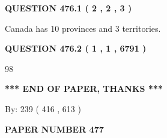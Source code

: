 \documentclass[12pt]{article}
\begin{document}
   
   
   
 \vspace{0.2in}
 
 
 
 
   
   
  
\vspace{0.2in}
  
{\textbf{\Large{QUESTION
476.1 
 ( 2 , 2 , 3 )
}}}
  
  
 
 
\noindent{}
 
 
Canada has 10  provinces and 3 territories.
 
 
 
 
  
\vspace{0.2in}
  
{\textbf{\Large{QUESTION
476.2 
 ( 1 , 1 , 6791 )
}}}
  
  
 
 
\noindent{}

98
 
 
   
   
 \vspace{0.2in}
 
   
   
   
   
\vspace{1.0in} 
{\textbf{\large{ *** END OF PAPER, THANKS *** }}} 
   
   
\hspace{1.0in} By: 
 239 ( 416 ,  613 )
   
   
   
   
\newpage 
\setcounter{page}{ 
   477001 } 
   
   
   
   
 {\textbf{ \Large{ PAPER NUMBER  477  }}}
   
   
\vspace{0.2in}
   
   
   
   
   
   
 \vspace{0.2in}
 
 
 
 
   
\end{document}
